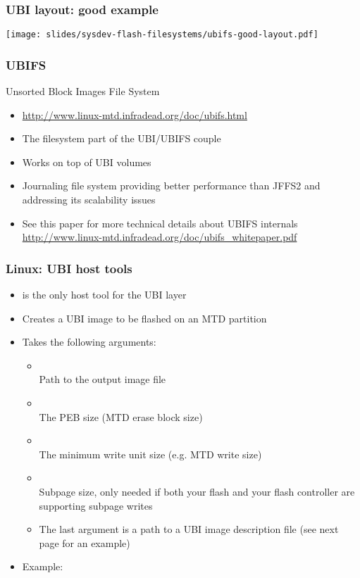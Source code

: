\begin{frame}
  \frametitle{UBI layout: good example}
  \begin{center}
    \texttt{[image: slides/sysdev-flash-filesystems/ubifs-good-layout.pdf]}
  \end{center}
\end{frame}

\begin{frame}
  \frametitle{UBIFS}
  Unsorted Block Images File System
  \begin{itemize}
  \item \url{http://www.linux-mtd.infradead.org/doc/ubifs.html}
  \item The filesystem part of the UBI/UBIFS couple
  \item Works on top of UBI volumes
  \item Journaling file system providing better performance than
    JFFS2 and addressing its scalability issues
  \item See this paper for more technical details about UBIFS internals
    \url{http://www.linux-mtd.infradead.org/doc/ubifs_whitepaper.pdf}
  \end{itemize}
\end{frame}

\begin{frame}
  \frametitle{Linux: UBI host tools}
  \begin{itemize}
  \item {} is the only host tool for the UBI layer
  \item Creates a UBI image to be flashed on an MTD partition
  \item Takes the following arguments:
    \begin{itemize}
    \item {}\\
	Path to the output image file
    \item {}\\
	The PEB size (MTD erase block size)
    \item {}\\
	The minimum write unit size (e.g. MTD write size)
    \item {}\\
	Subpage size, only needed if both your flash and your
	flash controller are supporting subpage writes
    \item The last argument is a path to a UBI image description file
	  (see next page for an example)
    \end{itemize}
  \item Example: 
  \end{itemize}
\end{frame}

